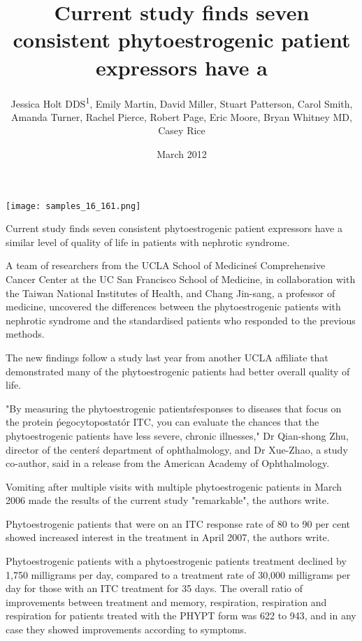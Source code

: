 \documentclass{article}
\title{Current study finds seven consistent phytoestrogenic patient expressors have a}
\author{Jessica Holt DDS\textsuperscript{1},  Emily Martin,  David Miller,  Stuart Patterson,  Carol Smith,  Amanda Turner,  Rachel Pierce,  Robert Page,  Eric Moore,  Bryan Whitney MD,  Casey Rice}
\affil{\textsuperscript{1}Blood Transfusion Centre of Slovenia}
\date{March 2012}
\begin{document}
\maketitle

\begin{center}
\begin{minipage}{0.75\linewidth}
\texttt{[image: samples\_16\_161.png]}
\end{minipage}
\end{center}

Current study finds seven consistent phytoestrogenic patient expressors have a similar level of quality of life in patients with nephrotic syndrome.

A team of researchers from the UCLA School of Medicine\'s Comprehensive Cancer Center at the UC San Francisco School of Medicine, in collaboration with the Taiwan National Institutes of Health, and Chang Jin-sang, a professor of medicine, uncovered the differences between the phytoestrogenic patients with nephrotic syndrome and the standardised patients who responded to the previous methods.

The new findings follow a study last year from another UCLA affiliate that demonstrated many of the phytoestrogenic patients had better overall quality of life.

"By measuring the phytoestrogenic patients\' responses to diseases that focus on the protein \'pegocytopostat\' or ITC, you can evaluate the chances that the phytoestrogenic patients have less severe, chronic illnesses," Dr Qian-shong Zhu, director of the center\'s department of ophthalmology, and Dr Xue-Zhao, a study co-author, said in a release from the American Academy of Ophthalmology.

Vomiting after multiple visits with multiple phytoestrogenic patients in March 2006 made the results of the current study "remarkable", the authors write.

Phytoestrogenic patients that were on an ITC response rate of 80 to 90 per cent showed increased interest in the treatment in April 2007, the authors write.

Phytoestrogenic patients with a phytoestrogenic patients treatment declined by 1,750 milligrams per day, compared to a treatment rate of 30,000 milligrams per day for those with an ITC treatment for 35 days. The overall ratio of improvements between treatment and memory, respiration, respiration and respiration for patients treated with the PHYPT form was 622 to 943, and in any case they showed improvements according to symptoms.
\end{document}
